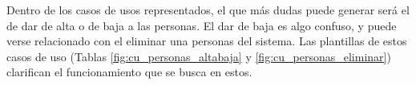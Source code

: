 Dentro de los casos de usos representados, el que más dudas puede generar será el de dar de alta o de baja a las personas. El dar de baja es algo confuso, y puede verse relacionado con el eliminar una personas del sistema. Las plantillas de estos casos de uso (Tablas \ref{fig:cu_personas_altabaja} y \ref{fig:cu_personas_eliminar}) clarifican el funcionamiento que se busca en estos.

\begin{table}[h!]
    \centering
\end{table}
